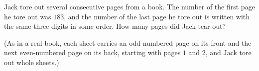 Jack tore out several consecutive pages from a book. The number of the first page he tore out was $183$, and the number of the last page he tore out is written with the same three digits in some order. How many pages did Jack tear out?

(As in a real book, each sheet carries an odd-numbered page on its front and the next even-numbered page on its back, starting with pages $1$ and $2$, and Jack tore out whole sheets.)
